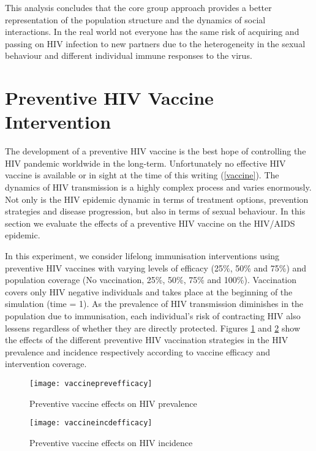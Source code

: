 This analysis concludes that the core group approach provides a better representation of
the population structure and the dynamics of social interactions. In the real world not
everyone has the same risk of acquiring and passing on HIV infection to new partners due
to the heterogeneity in the sexual behaviour and different individual immune responses to
the virus.\clearpage

\section{Preventive HIV Vaccine Intervention}\label{swnvaccine}

The development of a preventive HIV vaccine is the best hope of controlling the HIV
pandemic worldwide in the long-term. Unfortunately no effective HIV vaccine is available
or in sight at the time of this writing (\ref{vaccine}). The dynamics of HIV transmission
is a highly complex process and varies enormously. Not only is the HIV epidemic dynamic
in terms of treatment options, prevention strategies and disease progression, but also in
terms of sexual behaviour. In this section we evaluate the effects of a preventive HIV
vaccine on the HIV/AIDS epidemic.

In this experiment, we consider lifelong immunisation interventions using preventive HIV
vaccines with varying levels of  efficacy (25\%, 50\% and 75\%) and population coverage
(No vaccination, 25\%, 50\%, 75\% and 100\%). Vaccination covers only HIV negative
individuals and takes place at the beginning of the simulation (time = 1). As the
prevalence of HIV transmission diminishes in the population due to immunisation, each
individual's risk of contracting HIV also lessens regardless of whether they are directly
protected. Figures \ref{vaccineprevefficacy} and \ref{vaccineincdefficacy} show the
effects of the different preventive HIV vaccination strategies in the HIV prevalence and
incidence respectively according to vaccine efficacy and intervention coverage.

\begin{figure}[h]
\texttt{[image: vaccineprevefficacy]}
\caption{Preventive vaccine effects on HIV prevalence} \label{vaccineprevefficacy}
\end{figure}
\clearpage

\begin{figure}[ht]
\texttt{[image: vaccineincdefficacy]}
\caption{Preventive vaccine effects on HIV incidence} \label{vaccineincdefficacy}
\end{figure}

